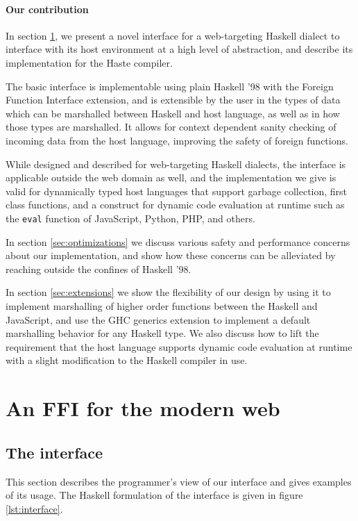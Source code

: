 \documentclass[preprint]{sigplanconf}
\begin{document}
\paragraph{Our contribution}\label{sec:contrib}
In section \ref{sec:interface}, we present a novel interface for a web-targeting
Haskell dialect to interface with its host environment at a high level of
abstraction, and describe its implementation for the Haste compiler.

The basic interface is implementable using plain Haskell '98 with the
Foreign Function Interface extension, and is extensible by the user in the
types of data which can be marshalled between Haskell and host language,
as well as in how those types are marshalled.
It allows for context dependent sanity
checking of incoming data from the host language, improving the safety
of foreign functions.

While designed and described for web-targeting Haskell dialects, the interface
is applicable outside the web domain as well, and the implementation we give
is valid for dynamically typed host languages that support garbage collection,
first class functions, and a construct for dynamic code evaluation at
runtime such as the \lstinline!eval! function of JavaScript, Python, PHP,
and others.

In section \ref{sec:optimizations} we discuss various safety and performance
concerns about our implementation, and show how these concerns can be
alleviated by reaching outside the confines of Haskell '98.

In section \ref{sec:extensions} we show the flexibility of our design by using
it to implement marshalling of higher order functions between the Haskell and
JavaScript, and use the GHC generics extension to implement a default
marshalling behavior for any Haskell type. We also discuss how to lift the
requirement that the host language supports dynamic code evaluation at runtime
with a slight modification to the Haskell compiler in use.

\section{An FFI for the modern web}\label{sec:interface}
\subsection{The interface}
This section describes the programmer's view of our interface and gives
examples of its usage.
The Haskell formulation of the interface is given in figure \ref{lst:interface}.
\end{document}
